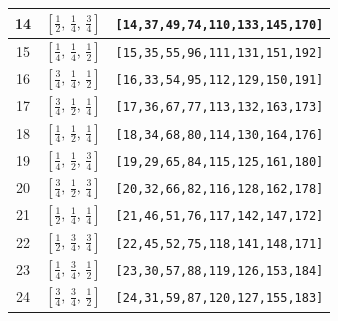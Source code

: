 \documentclass[fleqn,8pt]{jsarticle}
\begin{document}
\begin{longtable}{ccc}
14 & $\left[ \frac{1}{2},\, \frac{1}{4},\, \frac{3}{4} \right]$ & {\tt [14,37,49,74,110,133,145,170]} \\ \hline
15 & $\left[ \frac{1}{4},\, \frac{1}{4},\, \frac{1}{2} \right]$ & {\tt [15,35,55,96,111,131,151,192]} \\ \hline
16 & $\left[ \frac{3}{4},\, \frac{1}{4},\, \frac{1}{2} \right]$ & {\tt [16,33,54,95,112,129,150,191]} \\ \hline
17 & $\left[ \frac{3}{4},\, \frac{1}{2},\, \frac{1}{4} \right]$ & {\tt [17,36,67,77,113,132,163,173]} \\ \hline
18 & $\left[ \frac{1}{4},\, \frac{1}{2},\, \frac{1}{4} \right]$ & {\tt [18,34,68,80,114,130,164,176]} \\ \hline
19 & $\left[ \frac{1}{4},\, \frac{1}{2},\, \frac{3}{4} \right]$ & {\tt [19,29,65,84,115,125,161,180]} \\ \hline
20 & $\left[ \frac{3}{4},\, \frac{1}{2},\, \frac{3}{4} \right]$ & {\tt [20,32,66,82,116,128,162,178]} \\ \hline
21 & $\left[ \frac{1}{2},\, \frac{1}{4},\, \frac{1}{4} \right]$ & {\tt [21,46,51,76,117,142,147,172]} \\ \hline
22 & $\left[ \frac{1}{2},\, \frac{3}{4},\, \frac{3}{4} \right]$ & {\tt [22,45,52,75,118,141,148,171]} \\ \hline
23 & $\left[ \frac{1}{4},\, \frac{3}{4},\, \frac{1}{2} \right]$ & {\tt [23,30,57,88,119,126,153,184]} \\ \hline
24 & $\left[ \frac{3}{4},\, \frac{3}{4},\, \frac{1}{2} \right]$ & {\tt [24,31,59,87,120,127,155,183]} \\
\end{longtable}
\renewcommand{\arraystretch}{1.2}
\end{document}
